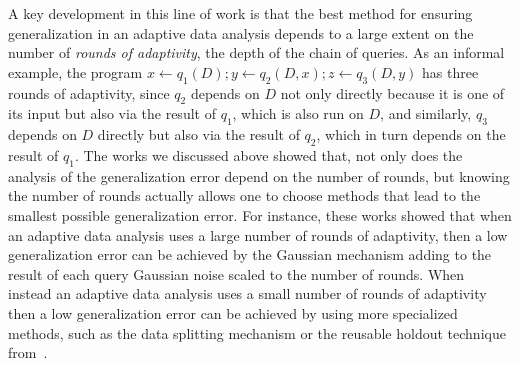 A key development in this line of work is that the best method for ensuring generalization in an adaptive data analysis depends to a large extent on the number of \emph{rounds of adaptivity}, the depth of the chain of queries. As an informal example, the program $x \leftarrow q_1(D);y \leftarrow q_2(D,x);z \leftarrow q_3(D,y)$ has three rounds of adaptivity, since $q_2$  depends on $D$ not only directly because it is one of its input but also via the result of $q_1$, which is also run on $D$, and similarly,  $q_3$ depends on $D$ directly but also via the result of $q_2$, which in turn depends on the result of $q_1$. The works we discussed above showed that, not only does the analysis of the generalization error depend on the number of rounds, but knowing the number of rounds actually allows one to choose methods that lead to the smallest possible generalization error. 
For instance, these works showed that when an adaptive data analysis uses a large number of rounds of adaptivity, then a low generalization error can be achieved by the Gaussian mechanism  
adding to the result of each query Gaussian noise scaled to the number of rounds. When instead  an adaptive data analysis uses a small number of rounds of adaptivity then a low generalization error can be achieved by using more specialized methods, such as the data splitting mechanism or the reusable holdout technique from~\citet{DworkFHPRR15}.
